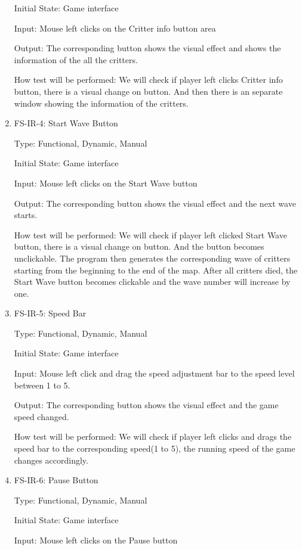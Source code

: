 \documentclass[12pt]{article}
\begin{document}
\begin{enumerate}
	Initial State: Game interface

	Input: Mouse left clicks on the Critter info button area

	Output: The corresponding button shows the visual effect and shows the information of the all the critters.

	How test will be performed: We will check if player left clicks Critter info button, there is a visual change on button. And then there is an separate window showing the information of the critters.

	
	\item{FS-IR-4: Start Wave Button}
					
	Type: Functional, Dynamic, Manual
					
	Initial State: Game interface
					
	Input: Mouse left clicks on the Start Wave button
					
	Output: The corresponding button shows the visual effect and the next wave starts.
					
	How test will be performed: We will check if player left clicked Start Wave button, there is a visual change on button. And the button becomes unclickable. The program then generates the corresponding wave of critters starting from the beginning to the end of the map. After all critters died, the Start Wave button becomes clickable and the wave number will increase by one. 
					
					
	\item{FS-IR-5: Speed Bar}
					
	Type: Functional, Dynamic, Manual
					
	Initial State: Game interface
					
	Input: Mouse left click and drag the speed adjustment bar to the speed level between 1 to 5.
					
	Output: The corresponding button shows the visual effect and the game speed changed.
					
    How test will be performed: We will check if player left clicks and drags the speed bar to the corresponding speed(1 to 5), the running speed of the game changes accordingly.
					

	\item{FS-IR-6: Pause Button}

	Type: Functional, Dynamic, Manual

	Initial State: Game interface

	Input:  Mouse left clicks on the Pause button


\end{enumerate}
\end{document}
